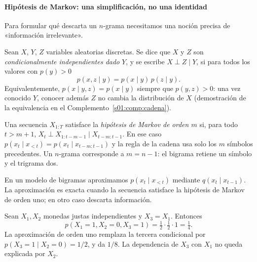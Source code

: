 \paragraph{Hipótesis de Markov: una simplificación, no una identidad}
Para formular qué descarta un $n$-grama necesitamos una noción precisa de
«información irrelevante».
\begin{definicion}\label{s01:def:ci}
Sean $X$, $Y$, $Z$ variables aleatorias discretas. Se dice que $X$ y $Z$ son
\emph{condicionalmente independientes dado} $Y$, y se escribe
$X\perp Z\mid Y$, si para todos los valores con $p(y)>0$
\[
p(x,z\mid y)=p(x\mid y)\,p(z\mid y).
\]
Equivalentemente, $p(x\mid y,z)=p(x\mid y)$ siempre que $p(y,z)>0$: una vez
conocido $Y$, conocer además $Z$ no cambia la distribución de $X$
(demostración de la equivalencia en el Complemento~\ref{s01:comp:cadena}).
\end{definicion}
\begin{definicion}\label{s01:def:markov}
Una secuencia $X_{1:T}$ satisface la \emph{hipótesis de Markov de orden $m$} si,
para todo $t>m+1$, $X_t\perp X_{1:t-m-1}\mid X_{t-m:t-1}$. En ese caso
$p(x_t\mid x_{<t})=p(x_t\mid x_{t-m:t-1})$ y la regla de la cadena usa solo los
$m$ símbolos precedentes. Un $n$-grama corresponde a $m=n-1$: el bigrama retiene
un símbolo y el trigrama dos.
\end{definicion}
En un modelo de bigramas aproximamos $p(x_t\mid x_{<t})$ mediante
$q(x_t\mid x_{t-1})$. La aproximación es exacta cuando la secuencia satisface la
hipótesis de Markov de orden uno; en otro caso descarta información.
\begin{center}
\end{center}
\begin{ejemplo}
Sean $X_1,X_2$ monedas justas independientes y $X_3=X_1$. Entonces
\[
p(X_1=1,X_2=0,X_3=1)=\tfrac12\cdot\tfrac12\cdot1=\tfrac14.
\]
La aproximación de orden uno remplaza la tercera condicional por $p(X_3=1\mid X_2=0)=1/2$, y da $1/8$. La dependencia de $X_3$ con $X_1$ no queda explicada por $X_2$.
\end{ejemplo}

